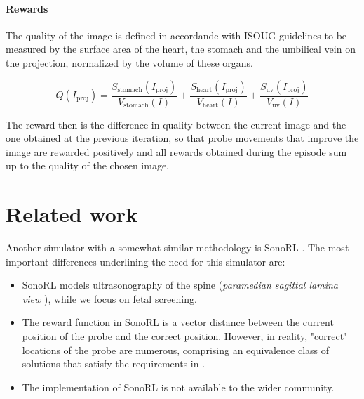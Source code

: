 \paragraph{Rewards}

The quality of the image is defined in accordande with ISOUG guidelines \cite{isoug-guidelines} to be measured by the surface area of the heart, the stomach and the umbilical vein on the projection, normalized by the volume of these organs.

\begin{equation}
    Q(I_\text{proj}) = \frac{S_\text{stomach}(I_\text{proj})}{V_\text{stomach}(I)} + \frac{S_\text{heart}(I_\text{proj})}{V_\text{heart}(I)} + \frac{S_\text{uv}(I_\text{proj})}{V_\text{uv}(I)}
\end{equation}

The reward then is the difference in quality between the current image and the one obtained at the previous iteration, so that probe movements that improve the image are rewarded positively and all rewards obtained during the episode sum up to the quality of the chosen image.

\newpage
\section{Related work}

Another simulator with a somewhat similar methodology is SonoRL \cite{sonorl}. The most important differences underlining the need for this simulator are:
\begin{itemize}
    \item SonoRL models ultrasonography of the spine (\emph{paramedian sagittal lamina view} \cite{spinal-guidelines}), while we focus on fetal screening.
    \item The reward function in SonoRL is a vector distance between the current position of the probe and the correct position. However, in reality, "correct" locations of the probe are numerous, comprising an equivalence class of solutions that satisfy the requirements in \cite{isoug-guidelines}.
    \item The implementation of SonoRL is not available to the wider community.
\end{itemize}